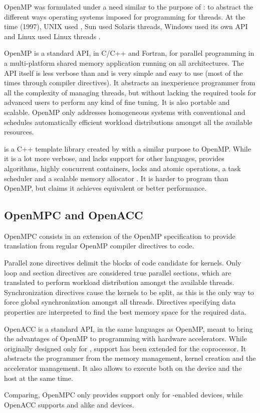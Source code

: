 \documentclass[../thesis]{subfiles}
\begin{document}
		OpenMP\cite{OpenMP,OpenMP:spec3.1} was formulated under a need similar to the purpose of \pthreads: to abstract the different ways operating systems imposed for programming for threads. At the time (1997), UNIX used \pthreads, Sun used Solaris threads, Windows used its own API and Linux used Linux threads \cite{Intel:pthreads_or_openmp}.

		OpenMP is a standard API, in C/C++ and Fortran, for parallel programming in a multi-platform shared memory application running on all architectures. The API itself is less verbose than \pthreads and is very simple and easy to use (most of the times through compiler directives). It abstracts an inexperience programmer from all the complexity of managing threads, but without lacking the required tools for advanced users to perform any kind of fine tuning. It is also portable and scalable. OpenMP only addresses homogeneous systems with conventional \cpus and schedules automatically efficient workload distributions amongst all the available resources.

		\intel\tbb is a C++ template library created by \intel with a similar purpose to OpenMP. While it is a lot more verbose, and lacks support for other languages, \tbb provides algorithms, highly concurrent containers, locks and atomic operations, a task scheduler and a scalable memory allocator \cite{TBB}. It is harder to program than OpenMP, but \intel claims it achieves equivalent or better performance.

		\subsection{OpenMPC and OpenACC}

		OpenMPC\cite{OpenMPC} consists in an extension of the OpenMP specification to provide translation from regular OpenMP compiler directives to \cuda code.

		Parallel zone directives delimit the blocks of code candidate for \cuda kernels. Only loop and section directives are considered true parallel sections, which are translated to perform workload distribution amongst the available threads. Synchronization directives cause the kernels to be split, as this is the only way to force global synchronization amongst all threads. Directives specifying data properties are interpreted to find the best \gpu memory space for the required data.

		OpenACC\cite{OpenACC:2.0} is a standard API, in the same languages as OpenMP, meant to bring the advantages of OpenMP to programming with hardware accelerators. While originally designed only for \gpus, support has been extended for the \intel\xeonphi coprocessor. It abstracts the programmer from the memory management, kernel creation and the accelerator management. It also allows to execute both on the device and the \gpu host at the same time.

		Comparing, OpenMPC only provides support only for \cuda-enabled devices, while OpenACC supports \nvidia and \amd\gpus alike and \intel\mic devices.
\end{document}

